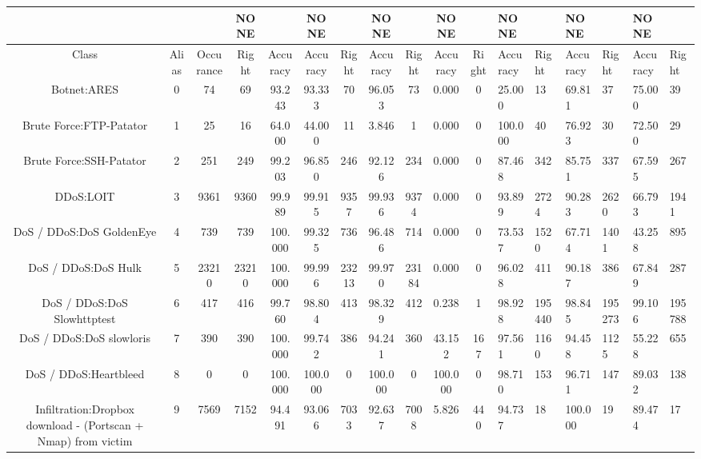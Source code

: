 \begin{table}[htb]
    \centering
    \begin{tabular}{@{}ccccccccccc@{}}
        \toprule
         &  &  & NONE &  & NONE &  & NONE &  & NONE &  & NONE &  & NONE &  & NONE &  \\
        \midrule
        Class &  Alias &  Occurance &  Right &  Accuracy &  Accuracy &  Right &  Accuracy &  Right &  Accuracy &  Right &  Accuracy &  Right &  Accuracy &  Right &  Accuracy &  Right \\
        Botnet:ARES &  0 &  74 &  69 &  93.243 &  93.333 &  70 &  96.053 &  73 &  0.000 &  0 &  25.000 &  13 &  69.811 &  37 &  75.000 &  39 \\
        Brute Force:FTP-Patator &  1 &  25 &  16 &  64.000 &  44.000 &  11 &  3.846 &  1 &  0.000 &  0 &  100.000 &  40 &  76.923 &  30 &  72.500 &  29 \\
        Brute Force:SSH-Patator &  2 &  251 &  249 &  99.203 &  96.850 &  246 &  92.126 &  234 &  0.000 &  0 &  87.468 &  342 &  85.751 &  337 &  67.595 &  267 \\
        DDoS:LOIT &  3 &  9361 &  9360 &  99.989 &  99.915 &  9357 &  99.936 &  9374 &  0.000 &  0 &  93.899 &  2724 &  90.283 &  2620 &  66.793 &  1941 \\
        DoS / DDoS:DoS GoldenEye &  4 &  739 &  739 &  100.000 &  99.325 &  736 &  96.486 &  714 &  0.000 &  0 &  73.537 &  1520 &  67.714 &  1401 &  43.258 &  895 \\
        DoS / DDoS:DoS Hulk &  5 &  23210 &  23210 &  100.000 &  99.996 &  23213 &  99.970 &  23184 &  0.000 &  0 &  96.028 &  411 &  90.187 &  386 &  67.849 &  287 \\
        DoS / DDoS:DoS Slowhttptest &  6 &  417 &  416 &  99.760 &  98.804 &  413 &  98.329 &  412 &  0.238 &  1 &  98.928 &  195440 &  98.845 &  195273 &  99.106 &  195788 \\
        DoS / DDoS:DoS slowloris &  7 &  390 &  390 &  100.000 &  99.742 &  386 &  94.241 &  360 &  43.152 &  167 &  97.561 &  1160 &  94.458 &  1125 &  55.228 &  655 \\
        DoS / DDoS:Heartbleed &  8 &  0 &  0 &  100.000 &  100.000 &  0 &  100.000 &  0 &  100.000 &  0 &  98.710 &  153 &  96.711 &  147 &  89.032 &  138 \\
        Infiltration:Dropbox download - (Portscan + Nmap) from victim &  9 &  7569 &  7152 &  94.491 &  93.066 &  7033 &  92.637 &  7008 &  5.826 &  440 &  94.737 &  18 &  100.000 &  19 &  89.474 &  17 \\

\end{tabular}
\end{table}
